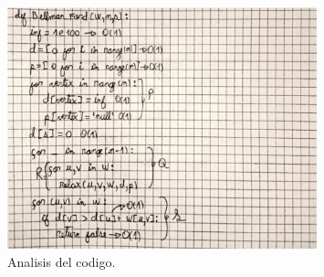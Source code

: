\begin{figure}[H]
	\centering
	\includegraphics[width=0.8\textwidth]{complejidad_distancia_ejem2_2.png}
	\caption{Analisis del codigo.}
	\label{fig:complejidad1}
\end{figure}